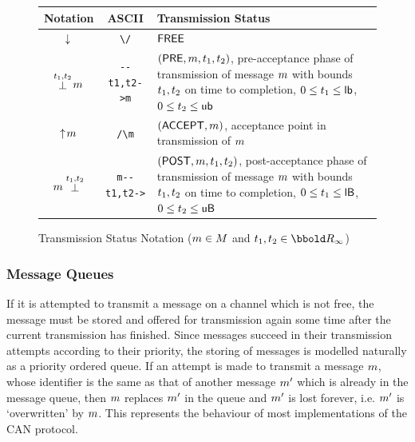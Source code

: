 \begin{figure}
\begin{center}  
\begin{tabular}{|c|c|p{.6\linewidth}|}
\hline 
\bfseries Notation & \bfseries ASCII & \hfil \bfseries Transmission Status \hfil \\
\hline \hline
${\negthinspace\mathop{\downarrow}}$ & \verb!\/! & ${\sf FREE}$ \\ \hline
${}{\mathrel{\stackrel{{t}_1,{t}_2}{\bot}}\negthinspace{m}}$ & \verb!--t1,t2->m! &
                     $({\sf PRE},{m},{t}_1,{t}_2)$, 
                     pre-acceptance phase of transmission of
                     message ${m}$ with bounds ${t}_1,{t}_2$ on time
                     to completion, $0 \leq {t}_1 \leq {{\sf lb}}$, 
                     $0 \leq {t}_2 \leq {{\sf ub}}$ \\ \hline 
${}{\mathrel{\uparrow}\negthinspace{m}}$ & \verb!/\m! &
                    $({\sf ACCEPT},{m})$,
                    acceptance point in transmission of ${m}$ \\ \hline
${}{{m}\mathrel{\stackrel{{t}_1,{t}_2}{\bot}}}$ & \verb!m--t1,t2->! &
                     $({\sf POST},{m},{t}_1,{t}_2)$,
                     post-acceptance phase of transmission of
                     message ${m}$ with bounds ${t}_1,{t}_2$ on time to 
                     completion, $0 \leq {t}_1 \leq {{\sf lB}}$, 
                     $0 \leq {t}_2 \leq {{\sf uB}}$ \\ \hline
\end{tabular} 
\end{center}
\caption{Transmission Status Notation (${m} \in {M}$ and $\ti\protect_1, 
  \ti\protect_2 \in \TimeInf$)\label{fig:transmissionstatus}}
\end{figure}

\subsubsection{Message Queues}
If it is attempted to transmit a message on a channel which is not
free, the message must be stored and offered for transmission again
some time after the current transmission has finished. Since messages
succeed in their transmission attempts according to their priority, 
the storing of messages is modelled naturally as a priority ordered
queue. If an attempt is made to transmit a message ${m}$, whose
identifier is the same as that of another message ${m}'$ which is
already in the message queue, then ${m}$ replaces ${m}'$ in the queue
and ${m}'$ is lost forever, i.e. ${m}'$ is `overwritten' by ${m}$.
This represents the behaviour of most implementations of the CAN protocol.

